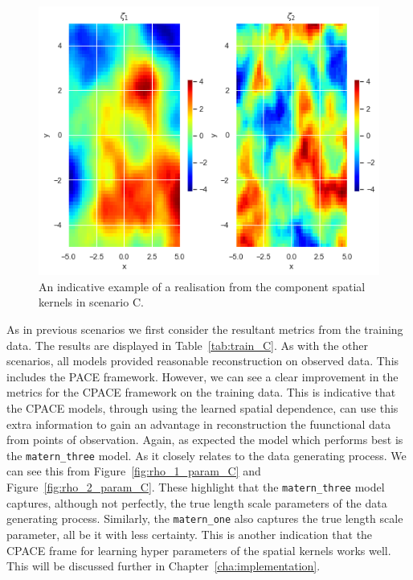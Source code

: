 \begin{figure}
	\centering
	\includegraphics[width=\textwidth]{sim_ex_zeta_C}
	\caption{An indicative example of a realisation from the component spatial kernels in scenario C.}
	\label{fig:sim_example_C}
\end{figure}

As in previous scenarios we first consider the resultant metrics from the training data.
The results are displayed in Table~\ref{tab:train_C}.
As with the other scenarios, all models provided reasonable reconstruction on observed data.
This includes the PACE framework.
However, we can see a clear improvement in the metrics for the CPACE framework on the training data.
This is indicative that the CPACE models, through using the learned spatial dependence, can use this extra information to gain an advantage in reconstruction the fuunctional data from points of observation.
Again, as expected the model which performs best is the \verb*|matern_three| model.
As it closely relates to the data generating process. 
We can see this from Figure~\ref{fig:rho_1_param_C} and Figure~\ref{fig:rho_2_param_C}. 
These highlight that the \verb*|matern_three| model captures, although not perfectly, the true length scale parameters of the data generating process.
Similarly, the \verb*|matern_one| also captures the true length scale parameter, all be it with less certainty.
This is another indication that the CPACE frame for learning hyper parameters of the spatial kernels works well. 
This will be discussed further in Chapter~\ref{cha:implementation}.


